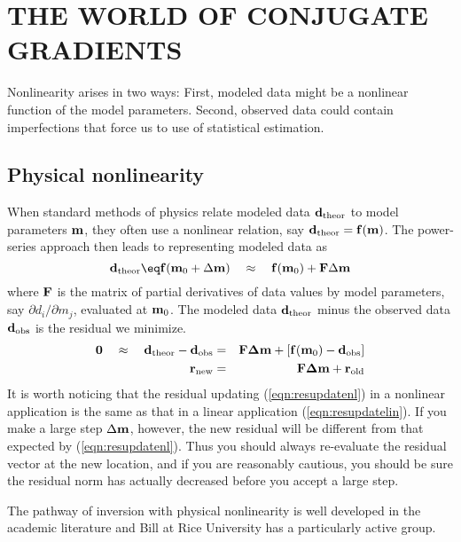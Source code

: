 
\section{THE WORLD OF CONJUGATE GRADIENTS}

Nonlinearity arises in two ways:
First, modeled data might be a nonlinear function of the model parameters.
Second, observed data could contain imperfections that force us to use
 of statistical estimation.

\subsection{Physical nonlinearity}
When standard methods of physics
relate modeled data $\bold d_{\rm theor}$ to model parameters $\bold m$,
they often use a nonlinear relation,
say $\bold d_{\rm theor} =\bold f(\bold m)$.
The power-series approach then leads to
representing modeled data as
\begin{equation}
\bold d_{\rm theor} \eq
  \bold f(\bold m_0 + \Delta \bold m)
  \quad\approx\quad
  \bold f\bold (\bold m_0) + \bold F\Delta \bold m
\end{equation}
where $\bold F$ is the matrix of partial derivatives
of data values by model parameters,
say $\partial d_i/\partial m_j$,
evaluated at $\bold m_0$.
The modeled data  $\bold d_{\rm theor}$ minus
the observed data $\bold d_{\rm obs}$ is the residual we minimize.
\begin{eqnarray}
\bold 0 \quad\approx\quad
 \bold d_{\rm theor} - \bold d_{\rm obs}
 &=& \bold F\bold \Delta\bold  m +[\bold f(\bold m_0) - \bold d_{\rm obs}] \\
\bold r_{\rm new}
 &=& \bold F\bold \Delta\bold  m + \bold r_{\rm old}
\label{eqn:resupdatenl}
\end{eqnarray}
It is worth noticing that the residual updating
(\ref{eqn:resupdatenl})
in a nonlinear application is the same
as that in a linear application (\ref{eqn:resupdatelin}).
If you make a large step $\Delta \bold m$, however,
the new residual
will be different from that expected by
(\ref{eqn:resupdatenl}).
Thus you should always re-evaluate the residual vector at the new location,
and if you are reasonably cautious,
you should be sure the residual norm has actually decreased
before you accept a large step.

\par
The pathway of inversion with physical nonlinearity
is well developed in the academic literature
and Bill  at Rice University has a particularly active group.

